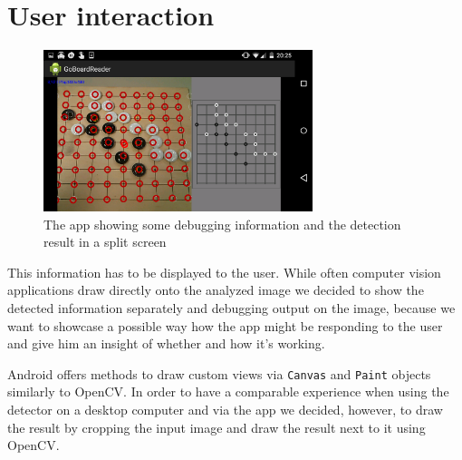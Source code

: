	\section{User interaction}
	\label{android-ui}
	\begin{figure}[h]
		\center
		\includegraphics[width=0.7\textwidth]{images/android_ui.png}
		\caption{The app showing some debugging information and the detection result in a split screen}
		\label{fig:android_ui}
	\end{figure}
	This information has to be displayed to the user. While often computer vision applications draw directly onto the analyzed image we decided to show the detected information separately and debugging output on the image, because we want to showcase a possible way how the app might be responding to the user and give him an insight of whether and how it's working.


	Android offers methods to draw custom views via \texttt{Canvas} and \texttt{Paint} objects similarly to OpenCV. In order to have a comparable experience when using the detector on a desktop computer and via the app we decided, however, to draw the result by cropping the input image and draw the result next to it using OpenCV.

